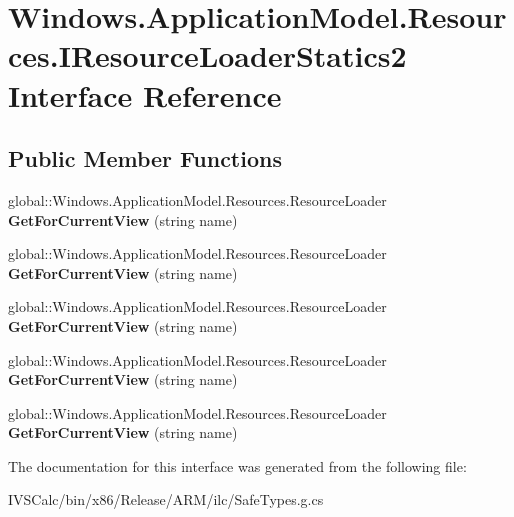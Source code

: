 \hypertarget{interface_windows_1_1_application_model_1_1_resources_1_1_i_resource_loader_statics2}{}\section{Windows.\+Application\+Model.\+Resources.\+I\+Resource\+Loader\+Statics2 Interface Reference}
\label{interface_windows_1_1_application_model_1_1_resources_1_1_i_resource_loader_statics2}
\subsection*{Public Member Functions}
\begin{DoxyCompactItemize}
\item 
\mbox{\label{interface_windows_1_1_application_model_1_1_resources_1_1_i_resource_loader_statics2_a23fbbe1f72884a7367b37e6f832b7864}} 
global\+::\+Windows.\+Application\+Model.\+Resources.\+Resource\+Loader {\bfseries Get\+For\+Current\+View} (string name)
\item 
\mbox{\label{interface_windows_1_1_application_model_1_1_resources_1_1_i_resource_loader_statics2_a23fbbe1f72884a7367b37e6f832b7864}} 
global\+::\+Windows.\+Application\+Model.\+Resources.\+Resource\+Loader {\bfseries Get\+For\+Current\+View} (string name)
\item 
\mbox{\label{interface_windows_1_1_application_model_1_1_resources_1_1_i_resource_loader_statics2_a23fbbe1f72884a7367b37e6f832b7864}} 
global\+::\+Windows.\+Application\+Model.\+Resources.\+Resource\+Loader {\bfseries Get\+For\+Current\+View} (string name)
\item 
\mbox{\label{interface_windows_1_1_application_model_1_1_resources_1_1_i_resource_loader_statics2_a23fbbe1f72884a7367b37e6f832b7864}} 
global\+::\+Windows.\+Application\+Model.\+Resources.\+Resource\+Loader {\bfseries Get\+For\+Current\+View} (string name)
\item 
\mbox{\label{interface_windows_1_1_application_model_1_1_resources_1_1_i_resource_loader_statics2_a23fbbe1f72884a7367b37e6f832b7864}} 
global\+::\+Windows.\+Application\+Model.\+Resources.\+Resource\+Loader {\bfseries Get\+For\+Current\+View} (string name)
\end{DoxyCompactItemize}


The documentation for this interface was generated from the following file\+:\begin{DoxyCompactItemize}
\item 
I\+V\+S\+Calc/bin/x86/\+Release/\+A\+R\+M/ilc/Safe\+Types.\+g.\+cs\end{DoxyCompactItemize}
